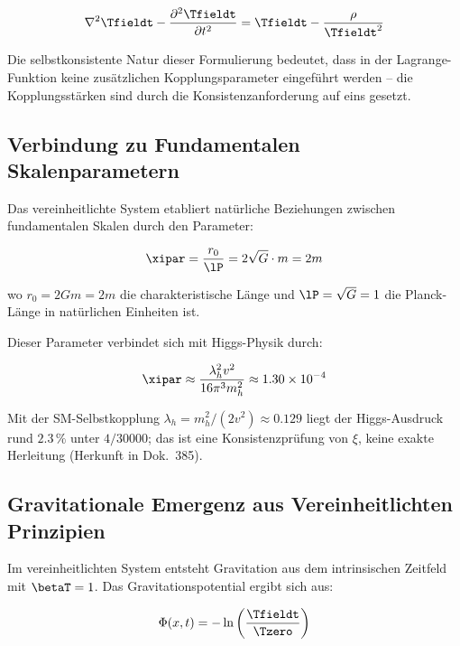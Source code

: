 	\begin{equation}
		\nabla^2 \Tfieldt - \frac{\partial^2 \Tfieldt}{\partial t^2} = \Tfieldt - \frac{\rho}{\Tfieldt^2}
	\end{equation}
	
	Die selbstkonsistente Natur dieser Formulierung bedeutet, dass in der Lagrange-Funktion keine zusätzlichen Kopplungsparameter eingeführt werden – die Kopplungsstärken sind durch die Konsistenzanforderung auf eins gesetzt.
	
	\subsection{Verbindung zu Fundamentalen Skalenparametern}
	\label{subsec:fundamental_scales}
	
	Das vereinheitlichte System etabliert natürliche Beziehungen zwischen fundamentalen Skalen durch den Parameter:
	
	\begin{equation}
		\xipar = \frac{r_0}{\lP} = 2\sqrt{G} \cdot m = 2m
	\end{equation}
	
	wo $r_0 = 2Gm = 2m$ die charakteristische Länge und $\lP = \sqrt{G} = 1$ die Planck-Länge in natürlichen Einheiten ist.
	
	Dieser Parameter verbindet sich mit Higgs-Physik durch:
	
	\begin{equation}
		\xipar \approx \frac{\lambda_h^2 v^2}{16\pi^3 m_h^2} \approx 1.30 \times 10^{-4}
	\end{equation}
	
	Mit der SM-Selbstkopplung $\lambda_h = m_h^2/(2v^2) \approx 0.129$ liegt der Higgs-Ausdruck rund $2.3\,\%$ unter $4/30000$; das ist eine Konsistenzprüfung von $\xi$, keine exakte Herleitung (Herkunft in Dok.~385).
	
	\subsection{Gravitationale Emergenz aus Vereinheitlichten Prinzipien}
	\label{subsec:gravitational_emergence_unified}
	
	Im vereinheitlichten System entsteht Gravitation aus dem intrinsischen Zeitfeld mit $\betaT = 1$. Das Gravitationspotential ergibt sich aus:
	
	\begin{equation}
		\Phi(x,t) = -\ln\left(\frac{\Tfieldt}{\Tzero}\right)
	\end{equation}
	
